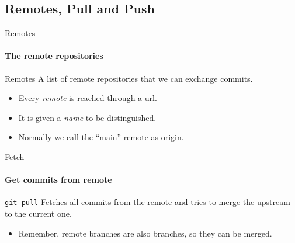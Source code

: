 \documentclass[aspectratio=169]{beamer}
\begin{document}
\subsection{Remotes, Pull and Push}

\begin{frame}{Remotes}
\framesubtitle{The remote repositories}

\begin{block}{Remotes}
	A list of remote repositories that we can exchange commits.
\end{block}

\begin{itemize}
	\item Every \emph{remote} is reached through a url.
	\item It is given a \emph{name} to be distinguished.
	\item Normally we call the ``main'' remote as \alert{origin}.
\end{itemize}

\end{frame}

\begin{frame}{Fetch}
\framesubtitle{Get commits from remote}

\begin{block}{\texttt{git pull}}
	Fetches all commits from the remote and tries to merge the upstream to the current one.
\end{block}

\begin{itemize}
	\item Remember, remote branches are also branches, so they can be merged.
\end{itemize}

\end{frame}
\end{document}
